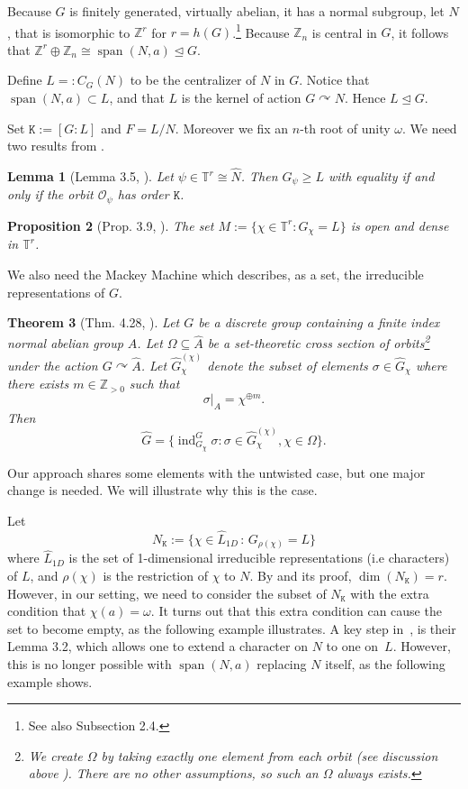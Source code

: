 \documentclass{amsart}
\newtheorem{theorem}{Theorem}[section]
\newtheorem{proposition}[theorem]{Proposition}
\newtheorem{lemma}[theorem]{Lemma}
\theoremstyle{definition}
\newcommand{\Z}{\mathbb{Z}}
\newcommand{\TT}{\mathbb{T}}
\DeclareMathOperator{\ind}{ind}
\DeclareMathOperator{\Span}{span}
\newcommand{\mt}{\mathtt}
\newcommand{\mc}{\mathcal}
\begin{document}
Because $G$ is finitely generated, virtually abelian, it has a normal subgroup, let $N$, that is isomorphic to $\Z^r$ for $r=h(G)$.\footnote{See also Subsection 2.4.}  Because $\Z_n$ is central in $G$, it follows that $\Z^r\oplus\Z_n\cong\Span(N,a)\unlhd G$. \par
Define $L=:C_G(N)$ to be the centralizer of $N$ in $G$. Notice that $\Span(N,a)\subset L$, and that $L$ is the kernel of action $G\curvearrowright N$. Hence $L\unlhd G$. \par
Set $\mt{K}:=[G:L]$ and $F=L/N$. Moreover we fix an $n$-th root of unity $\omega$. We need two results from \cite{paper_untwisted_case}.
\begin{lemma}[Lemma 3.5, \cite{paper_untwisted_case}]\label{minimal orbits}
   Let $\psi\in \TT^r\cong \widehat{N}$. Then $G_{\psi}\geq L$ with equality if and only if the orbit $\mc{O}_{\psi}$ has order $\mt{K}$.  
\end{lemma}
\begin{proposition}[Prop. 3.9, \cite{paper_untwisted_case}]\label{density of minimal stabilizer}
   The set $M:=\{\chi\in \TT^r: G_{\chi}=L\}$ is open and dense in $\TT^r$.
\end{proposition}
We also need the Mackey Machine which describes, as a set, the irreducible representations of $G$.
\begin{theorem}[Thm. 4.28, \cite{KanTay13}\label{thm:Mackey_machine}]
Let $G$ be a discrete group containing a finite index normal abelian group $A$. Let
$\Omega\subseteq\widehat{A}$ be a set-theoretic cross section of orbits\footnote{We create $\Omega$ by taking exactly one element from each orbit (see discussion above \cite[Thm. 4.28]{KanTay13}). There are no other assumptions, so such an $\Omega$ always exists.} under the action $G\curvearrowright \widehat{A}$. Let $\widehat{G}_{\chi}^{(\chi)}$ denote the subset of elements $\sigma\in\widehat{G}_{\chi}$ where there exists $m\in\Z_{>0}$ such that
\begin{equation}\label{eqn:block_diag_restriction}
\sigma\big|_{A}=\chi^{\oplus m}.
\end{equation}
    Then 
    $$\widehat{G}=\{\ind_{G_{\chi}}^G \sigma: \sigma\in \widehat{G}_{\chi}^{(\chi)}, \chi\in \Omega\}.$$
\end{theorem}
Our approach shares some elements with the untwisted case, but one major change is needed. We will illustrate why this is the case.\par
Let 
$$N_{\mt{K}}:=\{\chi \in \widehat{L}_{1D}\,\colon\, G_{\rho(\chi)}=L\}$$
where $\widehat{L}_{1D}$ is the set of 1-dimensional irreducible representations (i.e characters) of $L$, and $\rho(\chi)$ is the restriction of $\chi$ to $N$. By \cite[Prop. 3.10]{paper_untwisted_case} and its proof, $\dim(N_{\mt{K}})=r$. However, in our setting, we need to consider the subset of $N_{\mt{K}}$ with the extra condition that $\chi(a)=\omega$. It turns out that this extra condition can cause the set to become empty, as the following example illustrates. A key step in~\cite{paper_untwisted_case}, is their Lemma 3.2, which allows one to extend a character on $N$ to one on~$L$. However, this is no longer possible with $\Span(N, a)$ replacing $N$ itself, as the following example shows.
\end{document}
